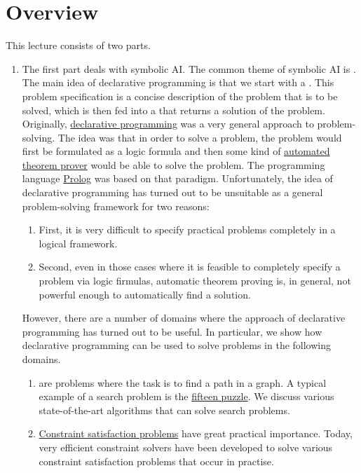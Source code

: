 \section{Overview}
This lecture consists of two parts.
\begin{enumerate}
\item The first part deals with symbolic AI.
      The common theme of symbolic AI is .  
      The main idea of declarative programming is that we start with a .
      This problem specification is a concise description of the problem that is to be solved, which is
      then fed into a  that returns a solution of the problem.  Originally, 
      \href{https://en.wikipedia.org/wiki/Declarative_programming}{declarative programming} was a very general
      approach to problem-solving.  The idea was that in order to solve a problem, the problem would first be
      formulated as a logic formula and then some kind of
      \href{https://en.wikipedia.org/wiki/Automated_theorem_proving}{automated theorem prover} would be
      able to solve the problem.  The programming language \href{https://en.wikipedia.org/wiki/Prolog}{Prolog}
      was based on that paradigm.  Unfortunately, the idea of declarative programming has
      turned out to be unsuitable as a general problem-solving framework for two reasons:
      \begin{enumerate}
      \item First, it is very difficult to specify practical problems completely in a logical framework.
      \item Second, even in those cases where it is feasible to completely specify a problem via logic firmulas,
            automatic theorem proving is, in general, not powerful enough to automatically find a solution. 
      \end{enumerate}
      However, there are a number of domains where the approach of declarative programming has turned out to be
      useful.  In particular, we show how declarative programming can be used to solve problems in the
      following domains.
      \begin{enumerate}
      \item {} are problems where the task is to find a path in a graph.  A typical example of a
            search problem is the \href{https://en.wikipedia.org/wiki/15_puzzle}{fifteen puzzle}.
            We discuss various state-of-the-art algorithms that can solve search problems.
      \item \href{https://en.wikipedia.org/wiki/Constraint_satisfaction_problem}{Constraint satisfaction problems} 
            have great practical importance.  Today, very efficient constraint solvers have been developed to
            solve various constraint satisfaction problems that occur in practise.


\end{enumerate}
\end{enumerate}
